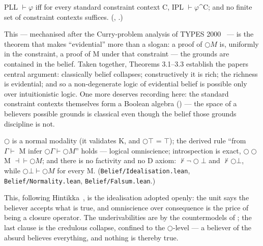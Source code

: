 \begin{theorem}\label{thm:ctx}
PLL \ensuremath{\vdash \varphi} iff for every
standard constraint context C, IPL \ensuremath{\vdash \varphi}\^{}C; and no finite set of
constraint contexts suffices.
(, .)
\end{theorem}

This — mechanised after the Curry-problem analysis of TYPES
2000~\cite{FairtloughMendler2002} — is the theorem that makes
``evidential'' more than a slogan: a proof
of \ensuremath{\bigcirc M} is, uniformly in the constraint, a proof of M under that
constraint --- the grounds are contained in the belief. Taken together,
Theorems 3.1--3.3 establish the paper\textquotesingle s central argument: classically
belief collapses; constructively it is rich; the richness is
evidential; and so a non-degenerate logic of evidential belief is
possible only over intuitionistic logic.
One more deserves recording here: the standard constraint contexts
themselves form a Boolean algebra ()
--- the space of a believer\textquotesingle s possible grounds is classical even
though the belief those grounds discipline is not.

\begin{proposition}\label{prop:profile}
\ensuremath{\bigcirc} is a normal modality (it validates K, and \ensuremath{\bigcirc\top} = \ensuremath{\top}); the derived
rule ``from \ensuremath{\Gamma \vdash} M infer \ensuremath{\bigcirc\Gamma \vdash \bigcirc M}'' holds --- logical omniscience;
introspection is exact, \ensuremath{\bigcirc\bigcirc}M \ensuremath{\dashv\vdash \bigcirc M}; and there is no factivity and
no D axiom: \ensuremath{\nvdash \lnot\bigcirc\bot} and \ensuremath{\nvdash \bigcirc\bot}, while
\ensuremath{\bigcirc\bot \vdash \bigcirc M} for every M.
(\texttt{Belief/\allowbreak{}Idealisation.lean}, \texttt{Belief/\allowbreak{}Normality.lean},
\texttt{Belief/\allowbreak{}Falsum.lean}.)
\end{proposition}

This, following Hintikka~\cite{Hintikka1962}, is the idealisation
adopted openly: the unit says the believer accepts what
is true, and omniscience over consequence is the price of being a
closure operator. The underivabilities are by the countermodels of
\cite[Fig.~3]{FairtloughMendler1997}; the last clause is the credulous
collapse, confined to the \ensuremath{\bigcirc}-level --- a believer of the absurd
believes everything, and nothing is thereby true.


